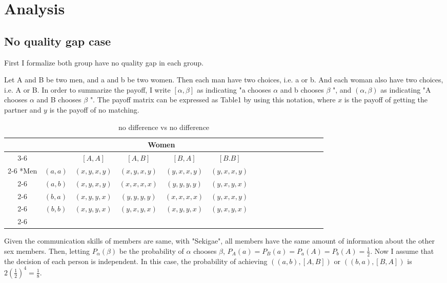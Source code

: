 \documentclass{article}
\begin{document}
\section{Analysis}
	\subsection{No quality gap case}
	\par
	First I formalize both group have no quality gap in each group.
	\par
	Let A and B be two men, and a and b be two women. Then each man have two choices, i.e. a or b. And each woman also have two choices, i.e. A or B. In order to summarize the payoff, I write $[\alpha, \beta]$ as indicating "a chooses $\alpha$ and b chooses $\beta$ ", and $(\alpha, \beta)$ as indicating "A chooses $\alpha$ and B chooses $\beta$ ". The payoff matrix can be expressed as Table1 by using this notation, where $x$ is the payoff of getting the partner and $y$ is the payoff of no matching.
	\begin{table}[h]
	\begin{center}
                \setlength{\extrarowheight}{2pt}
                \begin{tabular}{*{16}{c|}}
                  \multicolumn{2}{c}{} & \multicolumn{1}{c}{} & \multicolumn{2}{c}{Women}\\\cline{3-6}
                  \multicolumn{1}{c}{} &  & $[A, A]$  & $[A, B]$ & $[B, A]$ & $[B.B]$\\\cline{2-6}
                  \multirow{4}*{Men}  & $(a,a)$ & $(x,y,x,y)$ & $(x,y,x,y)$ & $(y,x,x,y)$ & $(y,x,x,y)$\\\cline{2-6}
                  & $(a,b)$ & $(x,y,x,y)$ & $(x,x,x,x)$ & $(y,y,y,y)$ & $(y,x,y,x)$\\\cline{2-6}
                  & $(b,a)$ & $(x,y,y,x)$ & $(y,y,y,y)$ & $(x,x,x,x)$ & $(y,x,x,y)$\\\cline{2-6}
                  & $(b,b)$ & $(x,y,y,x)$ & $(y,x,y,x)$ & $(x,y,y,x)$ & $(y,x,y,x)$\\\cline{2-6}
                \end{tabular}
        \end{center}
        \caption{no difference vs no difference}
  	\end{table}
	\par
	Given the communication skills of members are same, with "Sekigae", all members have the same amount of information about the other sex members. Then, letting $P_\alpha(\beta)$ be the probability of $\alpha$ chooses $\beta$, $P_A(a)= P_B(a) = P_a(A) = P_b(A) = \frac{1}{2}$. Now I assume that the decision of each person is independent. In this case, the probability of achieving $\left( (a, b), [A, B] \right)$ or $\left( (b, a), [B, A] \right)$ is $2 \left(\frac{1}{2}\right)^4 = \frac{1}{8}$.
\end{document}
